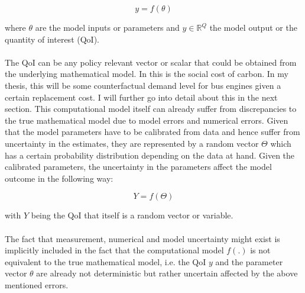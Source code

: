 \begin{equation}
	y = f(\theta)
	\label{compmodel}
\end{equation}

where $\theta$ are the model inputs or parameters and $y \in \mathbb{R}^Q$ the model output or the quantity of interest (QoI). \paragraph{}
The QoI can be any policy relevant vector or scalar that could be obtained from the underlying mathematical model. In \cite{Cai.2019} this is the social cost of carbon. In my thesis, this will be some counterfactual demand level for bus engines given a certain replacement cost. I will further go into detail about this in the next section. This computational model itself can already suffer from discrepancies to the true mathematical model due to model errors and numerical errors. Given that the model parameters have to be calibrated from data and hence suffer from uncertainty in the estimates, they are represented by a random vector $\Theta$ which has a certain probability distribution depending on the data at hand. Given the calibrated parameters, the uncertainty in the parameters affect the model outcome in the following way:

\begin{equation}
	Y = f(\Theta)
	\label{uncertaincompmodel}
\end{equation}

with $Y$ being the QoI that itself is a random vector or variable. \paragraph{}

The fact that measurement, numerical and model uncertainty might exist is implicitly included in the fact that the computational model $f(.)$ is not equivalent to the true mathematical model, i.e. the QoI $y$ and the parameter vector $\theta$ are already not deterministic but rather uncertain affected by the above mentioned errors.


